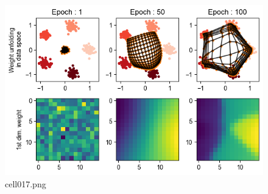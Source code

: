 \begin{figure}[ht]
	\centering
	\includegraphics[scale=0.8, max width=\linewidth]{./fig/local-learning-rule/self-organizing-map/cell017.png}
	\caption{cell017.png}
	\label{cell017.png}
\end{figure}